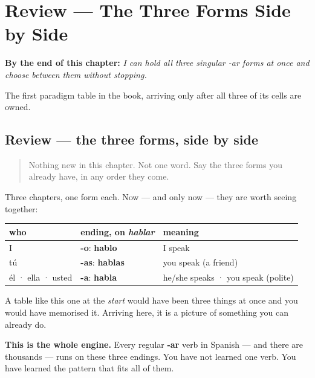 
\chapter{Review --- The Three Forms Side by Side}
\label{ch:review-ar-singular}

\begin{chapteropening}
\textbf{By the end of this chapter:} \emph{I can hold all three singular -ar forms at once and choose between them without stopping.}

The first paradigm table in the book, arriving only after all three of its cells are owned.
\end{chapteropening}

\section[Practice]{Review — the three forms, side by side}

\label{lesson:ES-C06-ar-presente}



\begin{quote}
Nothing new in this chapter. Not one word. Say the three forms you already have, in any order they come.
\end{quote}

\begin{grammarlens}[title={Grammar Lens: the table you have earned}]
Three chapters, one form each. Now — and only now — they are worth seeing together:

\noindent
\begin{tabularx}{\linewidth}{@{}>{\raggedright\arraybackslash}X>{\raggedright\arraybackslash}X>{\raggedright\arraybackslash}X@{}}
\toprule
\textbf{who} & \textbf{ending, on \emph{hablar}} & \textbf{meaning} \\
\midrule
I & \textbf{-o}: \textbf{hablo} & I speak \\
tú & \textbf{-as}: \textbf{hablas} & you speak (a friend) \\
él · ella · usted & \textbf{-a}: \textbf{habla} & he/she speaks · you speak (polite) \\
\bottomrule
\end{tabularx}

A table like this one at the \emph{start} would have been three things at once and you would have memorised it. Arriving here, it is a picture of something you can already do.

\textbf{This is the whole engine.} Every regular \textbf{-ar} verb in Spanish — and there are thousands — runs on these three endings. You have not learned one verb. You have learned the pattern that fits all of them.
\end{grammarlens}

